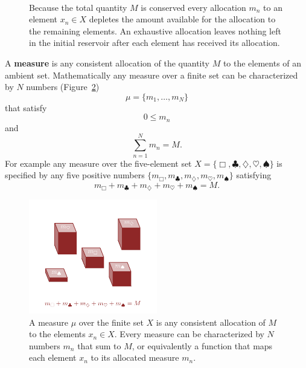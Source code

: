 \documentclass[
  letterpaper,
  DIV=11,
  numbers=noendperiod]{scrartcl}
\begin{document}
\begin{figure}
\begin{minipage}[t]{0.50\linewidth}
{{}

}

\subcaption{\label{fig-allocatione}}
\end{minipage}%
%
\begin{minipage}[t]{0.25\linewidth}

{\centering 

~

}

\end{minipage}%

\caption{\label{fig-allocation}Because the total quantity \(M\) is
conserved every allocation \(m_{n}\) to an element \(x_{n} \in X\)
depletes the amount available for the allocation to the remaining
elements. An exhaustive allocation leaves nothing left in the initial
reservoir after each element has received its allocation.}

\end{figure}

A \textbf{measure} is any consistent allocation of the quantity \(M\) to
the elements of an ambient set. Mathematically any measure over a finite
set can be characterized by \(N\) numbers (Figure~\ref{fig-measure}) \[
\mu = \{ m_{1}, \ldots, m_{N} \}
\] that satisfy \[
0 \le m_{n}
\] and \[
\sum_{n = 1}^{N} m_{n} = M.
\] For example any measure over the five-element set
\(X = \{\Box, \clubsuit, \diamondsuit, \heartsuit, \spadesuit\}\) is
specified by any five positive numbers
\(\{ m_\Box, m_\clubsuit, m_\diamondsuit, m_\heartsuit, m_\spadesuit \}\)
satisfying \[
m_\Box + m_\clubsuit + m_\diamondsuit + m_\heartsuit + m_\spadesuit = M.
\]

\begin{figure}

{\centering \includegraphics[width=0.5\textwidth,height=\textheight]{figures/measure/measure.pdf}

}

\caption{\label{fig-measure}A measure \(\mu\) over the finite set \(X\)
is any consistent allocation of \(M\) to the elements \(x_{n} \in X\).
Every measure can be characterized by \(N\) numbers \(m_{n}\) that sum
to \(M\), or equivalently a function that maps each element \(x_{n}\) to
its allocated measure \(m_{n}\).}

\end{figure}
\end{document}
